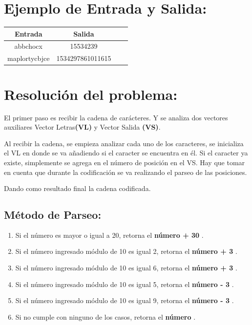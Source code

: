 \documentclass[12pt,a4paper]{article}
\begin{document}
\section{Ejemplo de Entrada y Salida: }
\begin{center}
\begin{tabular}{|*{2}{c|}l r|}
  \hline
  Entrada & Salida \\
  \hline
   abbchocx & 15534239 \\
   maplortycbjce & 1534297861011615 \\
  \hline
\end{tabular}
\end{center}

\section{Resoluci\'on del problema: }
El primer paso es recibir la cadena de car\'acteres. Y se analiza dos vectores auxiliares Vector Letras{\bf (VL)} y Vector Salida {\bf (VS)}.

Al recibir la cadena, se empieza analizar cada uno de los caracteres, se inicializa el VL en donde se va añadiendo si el caracter se encuentra en \'el.  Si el caracter ya existe, simplemente se agrega en el n\'umero de posici\'on en el VS. Hay que tomar en cuenta que durante la codificaci\'on se va realizando el parseo de las posiciones.

Dando como resultado final la cadena codificada.

\subsection{M\'etodo de Parseo:}
\begin{enumerate}
\item Si el n\'umero es mayor o igual a 20, retorna el {\bf n\'umero + 30 }.
\item Si el n\'umero ingresado m\'odulo de 10 es igual 2, retorna el {\bf n\'umero + 3 }.
\item Si el n\'umero ingresado m\'odulo de 10 es igual 6, retorna el {\bf n\'umero + 3 }.
\item Si el n\'umero ingresado m\'odulo de 10 es igual 5, retorna el {\bf n\'umero - 3 }.
\item Si el n\'umero ingresado m\'odulo de 10 es igual 9, retorna el {\bf n\'umero - 3 }.
\item Si no cumple con ninguno de los casos, retorna el {\bf n\'umero }.
\end{enumerate}
\end{document}
